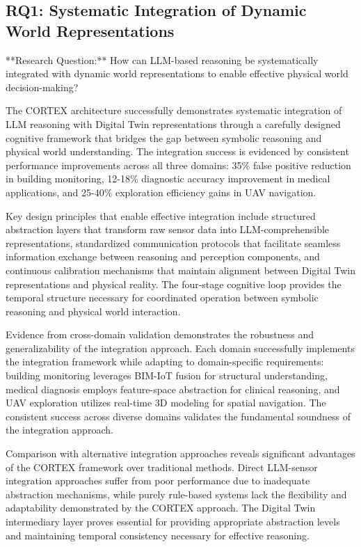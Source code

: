 \subsection{RQ1: Systematic Integration of Dynamic World Representations}

**Research Question:** How can LLM-based reasoning be systematically integrated with dynamic world representations to enable effective physical world decision-making?

The CORTEX architecture successfully demonstrates systematic integration of LLM reasoning with Digital Twin representations through a carefully designed cognitive framework that bridges the gap between symbolic reasoning and physical world understanding. The integration success is evidenced by consistent performance improvements across all three domains: 35\% false positive reduction in building monitoring, 12-18\% diagnostic accuracy improvement in medical applications, and 25-40\% exploration efficiency gains in UAV navigation.

Key design principles that enable effective integration include structured abstraction layers that transform raw sensor data into LLM-comprehensible representations, standardized communication protocols that facilitate seamless information exchange between reasoning and perception components, and continuous calibration mechanisms that maintain alignment between Digital Twin representations and physical reality. The four-stage cognitive loop provides the temporal structure necessary for coordinated operation between symbolic reasoning and physical world interaction.

Evidence from cross-domain validation demonstrates the robustness and generalizability of the integration approach. Each domain successfully implements the integration framework while adapting to domain-specific requirements: building monitoring leverages BIM-IoT fusion for structural understanding, medical diagnosis employs feature-space abstraction for clinical reasoning, and UAV exploration utilizes real-time 3D modeling for spatial navigation. The consistent success across diverse domains validates the fundamental soundness of the integration approach.

Comparison with alternative integration approaches reveals significant advantages of the CORTEX framework over traditional methods. Direct LLM-sensor integration approaches suffer from poor performance due to inadequate abstraction mechanisms, while purely rule-based systems lack the flexibility and adaptability demonstrated by the CORTEX approach. The Digital Twin intermediary layer proves essential for providing appropriate abstraction levels and maintaining temporal consistency necessary for effective reasoning.


